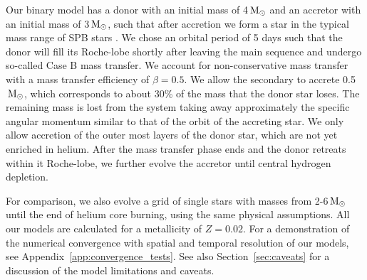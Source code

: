 \documentclass[desactivate]{aa}
\begin{document}
Our binary model has a donor with an initial mass of 4$\,{\rm M_\odot}$ and an accretor with an initial mass of 3$\,{\rm M_\odot}$, such that after accretion we form a star in the typical mass range of SPB stars \citep{Waelkens+1985, Waelkens+1991, Kurtz+2022}. We chose an orbital period of 5 days such that the donor will fill its Roche-lobe shortly after leaving the main sequence and undergo so-called Case B mass transfer. We account for non-conservative mass transfer with a mass transfer efficiency of $\beta = 0.5$. We allow the secondary to accrete 0.5$\,{\rm M_\odot}$, which corresponds to about 30\% of the mass that the donor star loses.  The remaining mass is lost from the system taking away approximately the specific angular momentum similar to that of the orbit of the accreting star. We only allow accretion of the outer most layers of the donor star, which are not yet enriched in helium. After the mass transfer phase ends and the donor retreats within it Roche-lobe, we further evolve the accretor until central hydrogen depletion. 

For comparison, we also evolve a grid of single stars with masses from 2-6$\,{\rm M_\odot}$ until the end of helium core burning, using the same physical assumptions. All our models are calculated for a metallicity of $Z = 0.02$.  For a demonstration of the numerical convergence with spatial and temporal resolution of our models, see Appendix~\ref{app:convergence_tests}. See also  Section~\ref{sec:caveats} for a discussion of the model limitations and caveats. 





\end{document}
